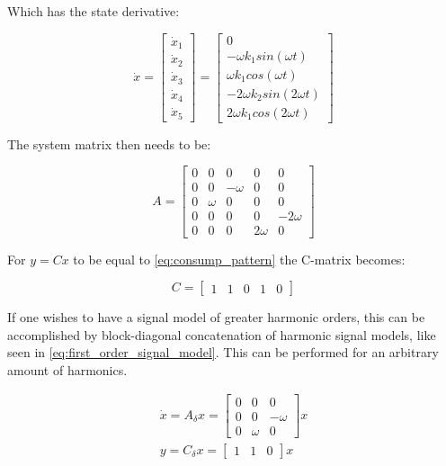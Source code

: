 Which has the state derivative:

\begin{equation} \label{eq:consump_x_deriv_l}
	\dot x =  \begin{bmatrix}
		\dot x_1 \\
		\dot x_2 \\
		\dot x_3 \\
		\dot x_4 \\
		\dot x_5
	\end{bmatrix}
	=
	\begin{bmatrix}
		0 \\
		- \omega k_1 sin(\omega t) \\
		\omega k_1 cos(\omega t) \\
		- 2\omega k_2 sin (2 \omega t) \\
		2 \omega k_1 cos(2 \omega t)
	\end{bmatrix}
\end{equation}


The system matrix then needs to be:

\begin{equation} \label{eq:consump_A}
A = 
\begin{bmatrix}
	0 & 0 & 0 & 0 & 0 \\
	0 & 0 & -\omega & 0 & 0 \\
	0 & \omega & 0 & 0 & 0 \\
	0 & 0 & 0 & 0 & -2\omega \\
	0 & 0 & 0 & 2\omega & 0 
\end{bmatrix}
\end{equation}

For $y = Cx$ to be equal to \cref{eq:consump_pattern} the C-matrix becomes: 

\begin{equation}
	C = \begin{bmatrix} 1 & 1 & 0 & 1 & 0 \end{bmatrix}
\end{equation}

If one wishes to have a signal model of greater harmonic orders, this can be accomplished by block-diagonal concatenation of harmonic signal models, like seen in \cref{eq:first_order_signal_model}. This can be performed for an arbitrary amount of harmonics. 

\begin{equation}\label{eq:first_order_signal_model}
	\begin{gathered}
		\dot{x} = A_\delta x =  \begin{bmatrix}0 & 0 & 0 \\ 0 & 0 & -\omega \\ 0 & \omega & 0	\end{bmatrix}x \\
		y = C_\delta x = \begin{bmatrix} 1 & 1 & 0 \end{bmatrix} x
	\end{gathered}
\end{equation}

